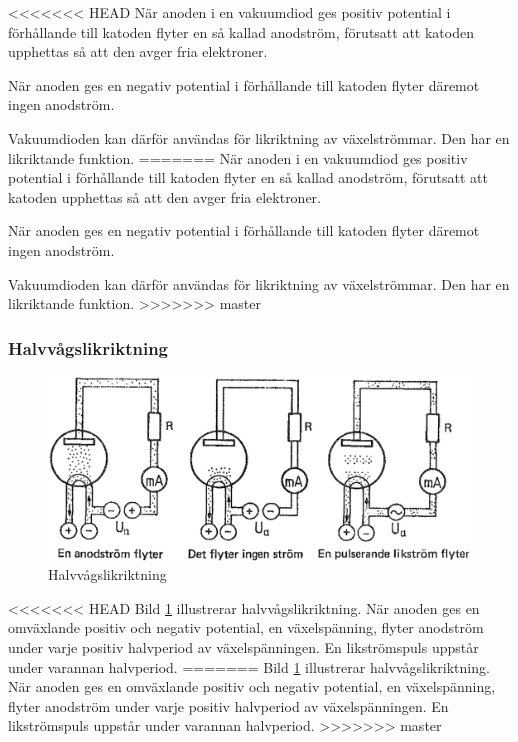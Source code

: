 <<<<<<< HEAD
När anoden i en vakuumdiod ges positiv potential i förhållande till
katoden flyter en så kallad anodström, förutsatt att katoden upphettas
så att den avger fria elektroner.

När anoden ges en negativ potential i förhållande till katoden flyter
däremot ingen anodström.

Vakuumdioden kan därför användas för likriktning av växelströmmar. Den
har en likriktande funktion.
=======
När anoden i en vakuumdiod ges positiv potential i förhållande till katoden
flyter en så kallad anodström, förutsatt att katoden upphettas så att den avger
fria elektroner.

När anoden ges en negativ potential i förhållande till katoden flyter däremot
ingen anodström.

Vakuumdioden kan därför användas för likriktning av växelströmmar.
Den har en likriktande funktion.
>>>>>>> master

\subsubsection{Halvvågslikriktning}

\begin{figure}
\includegraphics[width=\textwidth]{images/cropped_pdfs/bild_2_2-27.pdf}
\caption{Halvvågslikriktning}
\label{fig:BildII2-27}
\end{figure}

<<<<<<< HEAD
Bild \ref{fig:BildII2-27} illustrerar halvvågslikriktning. När anoden
ges en omväxlande positiv och negativ potential, en växelspänning,
flyter anodström under varje positiv halvperiod av växelspänningen. En
likströmspuls uppstår under varannan halvperiod.
=======
Bild \ref{fig:BildII2-27} illustrerar halvvågslikriktning.
När anoden ges en omväxlande positiv och negativ potential, en växelspänning,
flyter anodström under varje positiv halvperiod av växelspänningen.
En likströmspuls uppstår under varannan halvperiod.
>>>>>>> master

